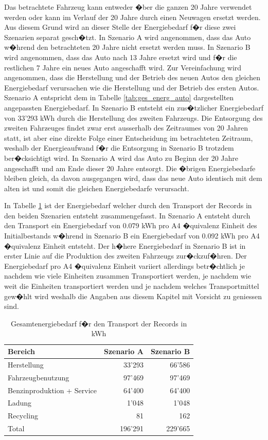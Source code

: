 \documentclass[a4paper,twoside,10pt]{report}
\begin{document}
Das betrachtete Fahrzeug kann entweder �ber die ganzen 20 Jahre verwendet werden oder kann im Verlauf der 20 Jahre durch einen Neuwagen ersetzt werden. Aus diesem Grund wird an dieser Stelle der Energiebedarf f�r diese zwei Szenarien separat gesch�tzt. In Szenario A wird angenommen, dass das Auto w�hrend den betrachteten 20 Jahre nicht ersetzt werden muss. In Szenario B wird angenommen, dass das Auto nach 13 Jahre ersetzt wird und f�r die restlichen 7 Jahre ein neues Auto angeschafft wird. Zur Vereinfachung wird angenommen, dass die Herstellung und der Betrieb des neuen Autos den gleichen Energiebedarf verursachen wie die Herstellung und der Betrieb des ersten Autos. Szenario A entspricht dem in Tabelle \ref{tab:ges_energ_auto} dargestellten angepassten Energiebedarf. In Szenario B entsteht ein zus�tzlicher Energiebedarf von 33'293 kWh durch die Herstellung des zweiten Fahrzeugs. Die Entsorgung des zweiten Fahrzeuges findet zwar erst ausserhalb des Zeitraumes von 20 Jahren statt, ist aber eine direkte Folge einer Entscheidung im betrachteten Zeitraum, weshalb der Energieaufwand f�r die Entsorgung in Szenario B trotzdem ber�cksichtigt wird. In Szenario A wird das Auto zu Beginn der 20 Jahre angeschafft und am Ende dieser 20 Jahre entsorgt. Die �brigen Energiebedarfe bleiben gleich, da davon ausgegangen wird, dass das neue Auto identisch mit dem alten ist und somit die gleichen Energiebedarfe verursacht. 

In Tabelle \ref{tab:ges_energ_transport} ist der Energiebedarf welcher durch den Transport der Records in den beiden Szenarien entsteht zusammengefasst. In Szenario A entsteht durch den Transport ein Energiebedarf von 0.079 kWh pro A4 �quivalenz Einheit des Initialbestands w�hrend in Szenario B ein Energiebedarf von 0.092 kWh pro A4 �quivalenz Einheit entsteht. Der h�here Energiebedarf in Szenario B ist in erster Linie auf die Produktion des zweiten Fahrzeugs zur�ckzuf�hren. Der Energiebedarf pro A4 �quivalenz Einheit variiert allerdings betr�chtlich je nachdem wie viele Einheiten zusammen Transportiert werden, je nachdem wie weit die Einheiten transportiert werden und je nachdem welches Transportmittel gew�hlt wird weshalb die Angaben aus diesem Kapitel mit Vorsicht zu geniessen sind.

\begin{table} [h]
	\begin{tabular}{l|r|r}
	\hline
	\textbf{Bereich} & \textbf{Szenario A} & \textbf{Szenario B} \\
	\hline
	Herstellung & 33'293 & 66'586 \\
	Fahrzeugbenutzung &	97'469 & 97'469 \\
	Benzinproduktion + Service & 64'400 & 64'400 \\
	Ladung	& 1'048 & 1'048 \\
	Recycling & 81& 162 \\
	\hline
	\hline
	Total  & 196'291 & 229'665 \\
	\hline
	\end{tabular}
\caption{Gesamtenergiebedarf f�r den Transport der Records in kWh} 
\label{tab:ges_energ_transport}
\end{table}
 
\end{document}
